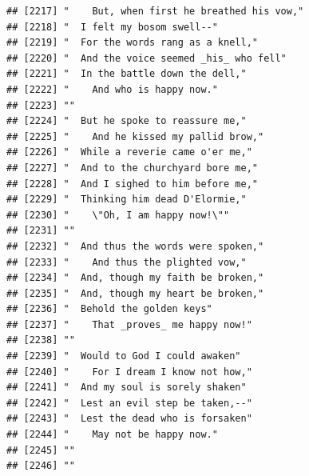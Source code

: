 \documentclass{article}\usepackage[]{graphicx}\usepackage[]{color}
\makeatletter
\newenvironment{kframe}{%
 \def\at@end@of@kframe{}%
 \ifinner\ifhmode%
  \def\at@end@of@kframe{\end{minipage}}%
  \begin{minipage}{\columnwidth}%
 \fi\fi%
 \def\FrameCommand##1{\hskip\@totalleftmargin \hskip-\fboxsep
 \colorbox{shadecolor}{##1}\hskip-\fboxsep
     \hskip-\linewidth \hskip-\@totalleftmargin \hskip\columnwidth}%
 \MakeFramed {\advance\hsize-\width
   \@totalleftmargin\z@ \linewidth\hsize
   \@setminipage}}%
 {\par\unskip\endMakeFramed%
 \at@end@of@kframe}
\newenvironment{knitrout}{}{} %
\makeatother
\begin{document}
\begin{knitrout}
\begin{kframe}
\begin{verbatim}
## [2217] "    But, when first he breathed his vow,"                                    
## [2218] "  I felt my bosom swell--"                                                   
## [2219] "  For the words rang as a knell,"                                            
## [2220] "  And the voice seemed _his_ who fell"                                       
## [2221] "  In the battle down the dell,"                                              
## [2222] "    And who is happy now."                                                   
## [2223] ""                                                                            
## [2224] "  But he spoke to reassure me,"                                              
## [2225] "    And he kissed my pallid brow,"                                           
## [2226] "  While a reverie came o'er me,"                                             
## [2227] "  And to the churchyard bore me,"                                            
## [2228] "  And I sighed to him before me,"                                            
## [2229] "  Thinking him dead D'Elormie,"                                              
## [2230] "    \"Oh, I am happy now!\""                                                 
## [2231] ""                                                                            
## [2232] "  And thus the words were spoken,"                                           
## [2233] "    And thus the plighted vow,"                                              
## [2234] "  And, though my faith be broken,"                                           
## [2235] "  And, though my heart be broken,"                                           
## [2236] "  Behold the golden keys"                                                    
## [2237] "    That _proves_ me happy now!"                                             
## [2238] ""                                                                            
## [2239] "  Would to God I could awaken"                                               
## [2240] "    For I dream I know not how,"                                             
## [2241] "  And my soul is sorely shaken"                                              
## [2242] "  Lest an evil step be taken,--"                                             
## [2243] "  Lest the dead who is forsaken"                                             
## [2244] "    May not be happy now."                                                   
## [2245] ""                                                                            
## [2246] ""                                                                            

\end{verbatim}
\end{kframe}
\end{knitrout}
\end{document}
